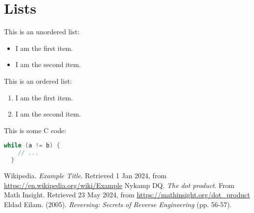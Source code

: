 \documentclass{article}
\begin{document}
\section{Lists}

This is an unordered list:

\begin{itemize}
  \item I am the first item.
  \item I am the second item.
\end{itemize}

This is an ordered list:

\begin{enumerate}
  \item I am the first item.
  \item I am the second item.
\end{enumerate}

This is some C code:

\begin{lstlisting}[language=C]
  while (a != b) {
    // ...
  }
\end{lstlisting}


\newpage
\begin{thebibliography}{9}
  Wikipedia. \textit{Example Title}. Retrieved 1 Jan 2024, from
  \url{https://en.wikipedia.org/wiki/Example}
  Nykamp DQ. \textit{The dot product}. From Math Insight. Retrieved 23 May 2024, from
  \url{https://mathinsight.org/dot_product}
  Eldad Eilam. (2005). \textit{Reversing: Secrets of Reverse Engineering} (pp. 56-57).
\end{thebibliography}
\end{document}
